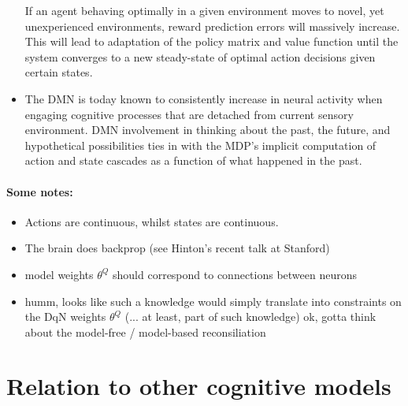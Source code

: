 \documentclass{article} %
\begin{document}
\begin{itemize}
  If an agent behaving optimally in a given environment moves
  to novel, yet unexperienced environments, reward prediction errors will
  massively increase. This will lead to adaptation of the policy matrix
  and value function until the system converges to a
  new steady-state of optimal action decisions given certain states.
  \item The DMN is today known to consistently increase in neural
  activity when engaging cognitive processes that are detached from
  current sensory environment. DMN involvement in thinking about the past,
  the future, and hypothetical possibilities ties in with the
  MDP's implicit computation of action and state cascades as a function
  of what happened in the past.
\end{itemize}





\paragraph*{Some notes:}
\begin{itemize}
  \item Actions are continuous, whilst states are continuous.
  \item The brain does backprop (see Hinton's recent talk at Stanford)
  \item model weights $\theta^Q$ should correspond to connections between neurons
\item humm, looks like such a knowledge would simply translate into constraints on the DqN weights $\theta^Q$ (... at least, part of such knowledge)
  ok, gotta think about the model-free / model-based reconsiliation
\end{itemize}


\section{Relation to other cognitive models}
\end{document}
